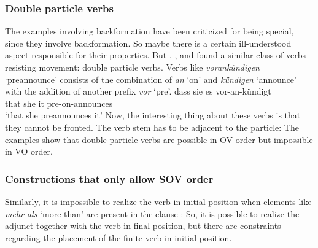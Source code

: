 \subsubsection{Double particle verbs}

The examples involving backformation have been criticized for being special, since they involve
backformation. So maybe there is a certain ill-understood aspect responsible for their properties. But
\citet[]{Haider93a},
\citet{Vikner2001a}, \citet{Fortmann2007a} and \citet[--60]{Haider2010a} found a similar
class of verbs resisting movement: double particle verbs. Verbs like \emph{vorankündigen} `preannounce'
consists of the combination of \emph{an} `on' and \emph{kündigen} `announce' with the addition of another prefix \emph{vor} `pre'.
\ea 
\label{ex-dass-sie-es-vorankündigt}
\gll dass sie es vor-an-kündigt\\
     that she it pre-on-announces\\
\glt `that she preannounces it'
\z
Now, the interesting thing about these verbs is that they cannot be fronted. The verb stem has to be
adjacent to the particle:
\eal
{}
\zl
The examples show that double particle verbs are possible in OV order but impossible in VO order.


\subsubsection{Constructions that only allow SOV order}

Similarly, it is impossible to realize the verb in initial position when elements like
\emph{mehr als} `more than' are present in the clause \parencites[Section~3.1]{Haider97c}[]{Meinunger2001a}: 
\eal
{}
\zl
So, it is possible to realize the adjunct together with the verb in final position, but there are
constraints regarding the placement of the finite verb in initial position.


